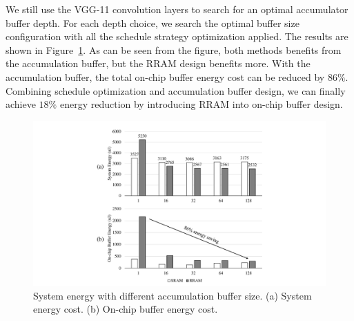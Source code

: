 

We still use the VGG-11 convolution layers to search for an optimal accumulator buffer depth. For each depth choice, we search the optimal buffer size configuration with all the schedule strategy optimization applied. The results are shown in Figure~\ref{fig:exp_buf_depth}. As can be seen from the figure, both methods benefits from the accumulation buffer, but the RRAM design benefits more. With the accumulation buffer, the total on-chip buffer energy cost can be reduced by $86\%$. Combining schedule optimization and accumulation buffer design, we can finally achieve $18\%$ energy reduction by introducing RRAM into on-chip buffer design.

\begin{figure}[t]
  \centering
  \includegraphics[width=1\columnwidth]{fig/buf_size.pdf}
  \caption{System energy with different accumulation buffer size. (a) System energy cost. (b) On-chip buffer energy cost.}
  \label{fig:exp_buf_depth}
\end{figure}